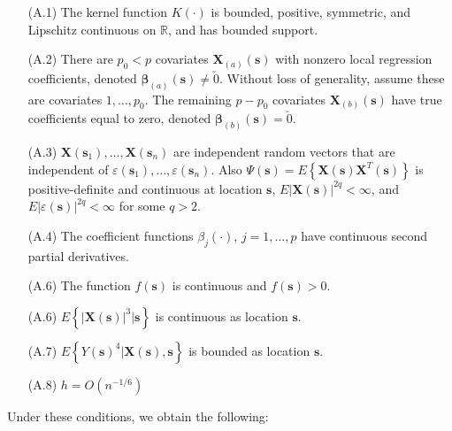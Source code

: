 \documentclass[authoryear,review, 12pt]{elsarticle}
\begin{document}
\begin{itemize}
\item[(A.1)] The kernel function $K\left(\cdot\right)$ is bounded, positive,
symmetric, and Lipschitz continuous on $\mathbb{R}$, and has bounded
support.
\item[(A.2)] There are $p_{0}<p$ covariates $\bm{X}_{\left(a\right)}\left(\bm{s}\right)$
with nonzero local regression coefficients, denoted $\bm{\beta}_{\left(a\right)}(\bm{s})\ne\utilde{0}$.
Without loss of generality, assume these are covariates $1,\dots,p_{0}$.
The remaining $p-p_{0}$ covariates $\bm{X}_{\left(b\right)}\left(\bm{s}\right)$
have true coefficients equal to zero, denoted $\bm{\beta}_{\left(b\right)}\left(\bm{s}\right)=\utilde{0}$.
\item[(A.3)] $\bm{X}\left(\bm{s}_{1}\right),\dots,\bm{X}\left(\bm{s}_{n}\right)$
are independent random vectors that are independent of $\varepsilon\left(\bm{s}_{1}\right),\dots,\varepsilon\left(\bm{s}_{n}\right)$.
Also $\Psi\left(\bm{s}\right)=E\left\{ \bm{X}\left(\bm{s}\right)\bm{X}^{T}\left(\bm{s}\right)\right\} $
is positive-definite and continuous at location $\bm{s}$, $E\left|\bm{X}\left(\bm{s}\right)\right|^{2q}<\infty$,
and $E\left|\varepsilon\left(\bm{s}\right)\right|^{2q}<\infty$ for
some $q>2$.
\item[(A.4)] The coefficient functions $ $$\beta_{j}\left(\cdot\right)$, $j=1,\dots,p$
have continuous second partial derivatives.
\item[(A.6)] The function $f\left(\bm{s}\right)$ is continuous and $f\left(\bm{s}\right)>0$.
\item[(A.6)] $E\left\{ \left|\bm{X}\left(\bm{s}\right)\right|^{3}|\bm{s}\right\} $
is continuous as location $\bm{s}$.
\item[(A.7)] $E\left\{ Y\left(\bm{s}\right)^{4}|\bm{X}\left(\bm{s}\right),\bm{s}\right\} $
is bounded as location $\bm{s}$.
\item[(A.8)] $h=O\left(n^{-1/6}\right)$
\end{itemize}
Under these conditions, we obtain the following:
\end{document}
